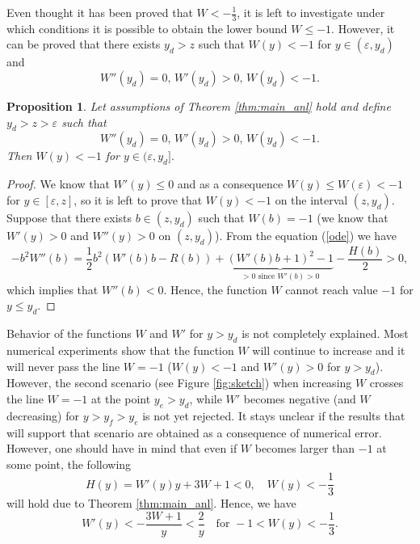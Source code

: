 \documentclass[reqno]{article}%
\theoremstyle{plain}
\newtheorem{proposition}{Proposition}[section]
\theoremstyle{definition}
\theoremstyle{remark}
\numberwithin{equation}{section}
\begin{document}
Even thought it has been proved that $W<-\frac{1}{3}$,  it is left to investigate under which conditions it is possible to obtain the lower bound $W\leq -1$. However, it can be proved that there exists $y_d>z$ such that $W(y)<-1$ for $y\in(\varepsilon,y_d)$ and
\[W''(y_d)=0,\, W'(y_d)>0,\, W(y_d)<-1.\]
\begin{proposition}
Let assumptions of  Theorem \ref{thm:main_anl} hold and define $y_d>z>\varepsilon$ such that
\[W''(y_d)=0,\, W'(y_d)>0,\, W(y_d)<-1.\]
Then $W(y)<-1$ for $y\in (\varepsilon,y_d].$
\end{proposition}
\begin{proof}
We know that $W'(y)\leq 0$ and as a consequence $W(y)\leq W(\varepsilon)<-1$ for $y\in[\varepsilon,z]$, so it is left to prove that $W(y)<-1$ on the interval $(z,y_d).$
Suppose that there exists $b\in (z, y_d)$ such that $W(b)=-1$ (we know that $W'(y)>0$ and $W''(y)>0$ on $(z, y_d)$). From the equation (\ref{ode}) we have
\[-b^2W''(b)=\frac{1}{2}b^2(W'(b)b-R(b))+\underbrace{(W'(b)b+1)^2-1}_{>0 \text{ since } W'(b)>0}-\frac{H(b)}{2}>0,\]
which implies that $W''(b)<0$. Hence, the function $W$ cannot reach value $-1$ for $y\leq y_d.$ 
\end{proof}


Behavior of the functions $W$ and $W'$ for $y>y_d$ is not completely explained. Most numerical experiments show that the function $W$ will continue to increase and it will never pass the line $W=-1$ ($W(y)<-1$ and $W'(y)>0$ for $y>y_d$). However, the second scenario (see Figure \ref{fig:sketch}) when  increasing $W$ crosses the line  $W=-1$ at the point $y_e>y_d$, while $W'$ becomes negative (and $W$ decreasing) for $y>y_f>y_e$ is not yet rejected. It stays unclear if the results that will support that scenario are obtained as a consequence of numerical error. However, one should have in mind that even if $W$ becomes larger than $-1$ at some point, the following
\[H(y)=W'(y)y+3W+1<0, \quad W(y)<-\frac{1}{3}\]
will hold due to Theorem \ref{thm:main_anl}. Hence, we have
\[W'(y)<-\frac{3W+1}{y}<\frac{2}{y} \quad \text{for } -1<W(y)<-\frac{1}{3}.\]

\end{document}

